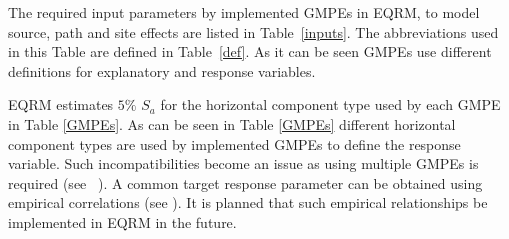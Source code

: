 The required input parameters by implemented GMPEs in EQRM, to model
source, path and site effects are listed in Table~\ref{inputs}. The
abbreviations used in this Table are defined in Table~\ref{def}. As
it can be seen GMPEs use different definitions for explanatory and
response variables.

EQRM estimates $5 \%$ $S_a$ for the horizontal component type used
by each GMPE in Table \ref{GMPEs}. As can be seen in Table
\ref{GMPEs} different horizontal component types are used by
implemented GMPEs to define the response variable. Such
incompatibilities become an issue as using multiple GMPEs is
required (see ~). A common target
response parameter can be obtained using empirical correlations (see
\citep{eqrm_Beyer06}). It is planned that such empirical
relationships be implemented in EQRM in the future.

